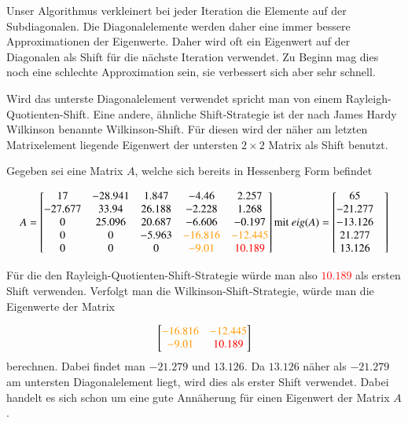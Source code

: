 Unser Algorithmus verkleinert bei jeder Iteration die Elemente auf der Subdiagonalen.
Die Diagonalelemente werden daher eine immer bessere Approximationen der Eigenwerte.
Daher wird oft ein Eigenwert auf der Diagonalen als Shift für die nächste Iteration verwendet.
Zu Beginn mag dies noch eine schlechte Approximation sein, sie verbessert sich aber sehr schnell.

Wird das unterste Diagonalelement verwendet spricht man von einem Rayleigh-Quotienten-Shift.
Eine andere, ähnliche Shift-Strategie ist der nach James Hardy Wilkinson benannte Wilkinson-Shift.
Für diesen wird der näher am letzten Matrixelement liegende Eigenwert der untersten \glqq $2\times2$ Matrix \grqq als Shift benutzt.

\begin{beispiel}
	Gegeben sei eine Matrix $A$, welche sich bereits in Hessenberg Form befindet
	
	\begin{equation}
	A=
	\begin{bmatrix}
	17 & -28.941 & 1.847 & -4.46 & 2.257\\
	-27.677 & 33.94 & 26.188 & -2.228 & 1.268\\
	0 & 25.096 & 20.687 & -6.606 & -0.197\\
	0 & 0 & -5.963 & \textcolor{orange}{-16.816} & \textcolor{orange}{-12.445}\\
	0 & 0 & 0 & \textcolor{orange}{-9.01} & \textcolor{red}{10.189}\\
	\end{bmatrix} \text{mit }
	eig(A)=
	\begin{bmatrix}
	65 & \\
	-21.277 & \\
	-13.126 & \\
	21.277 & \\
	13.126 & \\
	\end{bmatrix}
	\end{equation}
	
	Für die den Rayleigh-Quotienten-Shift-Strategie würde man also \textcolor{red}{$10.189$} als ersten Shift verwenden.
	Verfolgt man die Wilkinson-Shift-Strategie, würde man die Eigenwerte der Matrix

	\begin{equation}
	\begin{bmatrix}
	 \textcolor{orange}{-16.816} & \textcolor{orange}{-12.445}\\
	 \textcolor{orange}{-9.01} & \textcolor{red}{10.189}\\
	\end{bmatrix}
	\end{equation}
	berechnen.
	Dabei findet man $-21.279$ und $13.126$.
	Da $13.126$ näher als $-21.279$ am untersten Diagonalelement liegt, wird dies als erster Shift verwendet.
	Dabei handelt es sich schon um eine gute Annäherung für einen Eigenwert der Matrix $A$.	
\end{beispiel}


